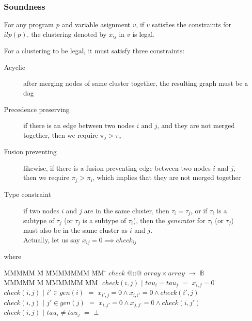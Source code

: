 

\subsubsection{Soundness}
For any program $p$ and variable asignment $v$, if $v$ satisfies the constraints for $ilp(p)$, the clustering denoted by $x_{ij}$ in $v$ is legal.

For a clustering to be legal, it must satisfy three constraints:
\begin{description}
\item[Acyclic]
after merging nodes of same cluster together, the resulting graph must be a dag
\item[Precedence preserving]
if there is an edge between two nodes $i$ and $j$, and they are not merged together, then we require $\pi_j > \pi_i$
\item[Fusion preventing]
likewise, if there is a fusion-preventing edge between two nodes $i$ and $j$, then we require $\pi_j > \pi_i$, which implies that they are not merged together
\item[Type constraint]
if two nodes $i$ and $j$ are in the same cluster, then $\tau_i = \tau_j$, or if $\tau_i$ is a subtype of $\tau_j$ (or $\tau_j$ is a subtype of $\tau_i$), then the \emph{generator} for $\tau_i$ (or $\tau_j$) must also be in the same cluster as $i$ and $j$.
    \\
    \TODO Actually, let us say $x_{ij} = 0 \implies check_{ij}$

\end{description}
where
\begin{tabbing}
MMMMM      \= M \= MMMMMMM \= MM \= \kill
$check$ \> @::@  \> $array \times array$ \> $\to$ \> $\mathbb{B}$ \\
MMMMM      \= M \= MMMMMM \= MM \= \kill
$check(i, j)$     \> $|$ \> $tau_i = tau_j$ \> $=$ \> $x_{i,j} = 0$                        \\
$check(i, j)$     \> $|$ \> $i' \in gen(i) $ \> $=$ \> $x_{i',j} = 0 \wedge x_{i,i'} = 0 \wedge check(i', j)$                        \\
$check(i, j)$     \> $|$ \> $j' \in gen(j) $ \> $=$ \> $x_{i,j'} = 0 \wedge x_{j,j'} = 0 \wedge check(i, j')$                        \\
$check(i, j)$     \> $|$ \> $tau_i \not= tau_j$\> $=$ \> $\bot$
\end{tabbing}






